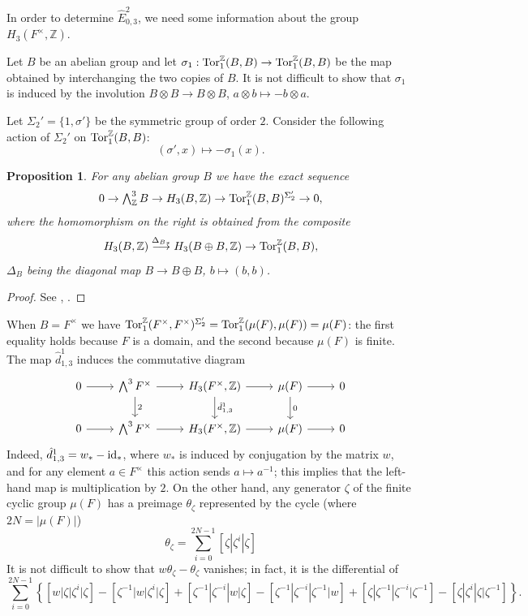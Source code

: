 \documentclass[11pt]{amsart}
\theoremstyle{definition}
\theoremstyle{plain}
\newtheorem{prp}[ntn]{Proposition}
\numberwithin{equation}{section}
\newcommand{\z}{\mathbb{Z}}
\newcommand{\tors}{{{\rm Tor}_1^{\z}}}
\newcommand{\arr}{\rightarrow}
\newcommand{\larr}{\longrightarrow}
\newcommand{\id}{{\rm id}}
\begin{document}
In order to determine $\hat{E}^2_{0,3}$, we need some information about the group $H_3(F^\times,\z)$.

Let $B$ be an abelian group and let $\sigma_1:\tors(B,B)\arr \tors(B,B)$
be the map obtained by interchanging the two copies of $B$. It is not difficult to show that $\sigma_1$ is induced by
the involution $B\otimes B \arr B\otimes B$, $a\otimes b\mapsto -b\otimes a$.

Let $\Sigma_2'=\{1, \sigma'\}$ be the symmetric group of order $2$. Consider the following action of 
$\Sigma_2'$ on $\tors(B,B)$:
\[
(\sigma', x)\mapsto -\sigma_1(x).
\]

\begin{prp}\label{H3B}
For any abelian group $B$ we have the exact sequence
\[
\begin{array}{c}
0 \arr \bigwedge_\z^3 B \arr H_3(B,\z) \arr \tors(B,B)^{\Sigma_2'} \arr 0,
\end{array}
\]
where the homomorphism on the right is obtained from the composite
\[
H_3(B,\z) \overset{{\Delta_B}_\ast}{\larr } H_3(B\oplus B,\z) \arr \tors(B,B),
\]
$\Delta_B$ being the diagonal map $B \arr B\oplus B$, $b \mapsto (b,b)$.
\end{prp}
\begin{proof}
See \cite[Lemma~5.5]{suslin1991}, \cite[Section 6]{breen1999}.
\end{proof}

When $B=F^\times$ we have $\tors(F^\times,F^\times)^{\Sigma'_2}=\tors(\mu(F),\mu(F))=\mu(F)$: the first equality holds because $F$ is a domain, and the second because $\mu(F)$ is finite. The map $\hat{d}^1_{1,3}$ induces the commutative diagram
\[
    \begin{tikzcd}
        0 \ar[r] & \bigwedge^3F^\times \ar[r]\ar[d,"2"] & H_3(F^\times,\z)\ar[r]\ar[d,"\hat{d}^1_{1,3}"] & \mu(F)\ar[r]\ar[d,"0"] & 0\\
        0 \ar[r] & \bigwedge^3F^\times \ar[r] & H_3(F^\times,\z)\ar[r] & \mu(F)\ar[r] & 0
    \end{tikzcd}
\]
Indeed, $\hat{d}^1_{1,3}=w_*-\id_*$, where $w_*$ is induced by conjugation by the matrix $w$, and for any element $a\in F^\times$ this action sends $a\mapsto a^{-1}$; this implies that the left-hand map is multiplication by $2$. On the other hand, any generator $\zeta$ of the finite cyclic group $\mu(F)$ has a preimage $\theta_{\zeta}$ represented by the cycle (where $2N=|\mu(F)|$)
\[
    \theta_{\zeta}=\sum^{2N-1}_{i=0}[\zeta|\zeta^i|\zeta]
\]
It is not difficult to show that $w\theta_{\zeta}-\theta_{\zeta}$ vanishes; in fact, it is the differential of
\[
    \sum^{2N-1}_{i=0}\left\{[w|\zeta|\zeta^i|\zeta]-[\zeta^{-1}|w|\zeta^i|\zeta]+[\zeta^{-1}|\zeta^{-i}|w|\zeta]-[\zeta^{-1}|\zeta^{-i}|\zeta^{-1}|w]+[\zeta|\zeta^{-1}|\zeta^{-i}|\zeta^{-1}]-[\zeta|\zeta^i|\zeta|\zeta^{-1}]\right\}.
\]
\end{document}
